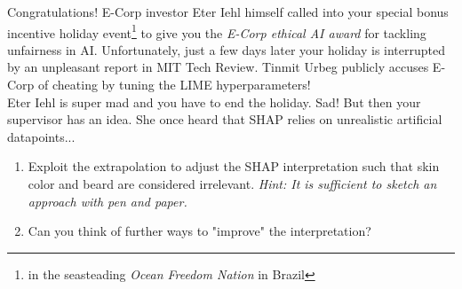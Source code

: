 \documentclass[a4paper]{article}
\begin{document}
{Congratulations! E-Corp investor Eter Iehl himself called into your special bonus incentive holiday event\footnote{in the seasteading \textit{Ocean Freedom Nation} in Brazil} to give you the \textit{E-Corp ethical AI award} for tackling unfairness in AI. Unfortunately, just a few days later your holiday is interrupted by an unpleasant report in MIT Tech Review. Tinmit Urbeg publicly accuses E-Corp of cheating by tuning the LIME hyperparameters!\\%
Eter Iehl is super mad and you have to end the holiday. Sad! But then your supervisor has an idea. She once heard that SHAP relies on unrealistic artificial datapoints...
\begin{enumerate}[resume]
    \item  Exploit the extrapolation to adjust the SHAP interpretation such that skin color and beard are considered irrelevant. \textit{Hint: It is sufficient to sketch an approach with pen and paper.}
    \item Can you think of further ways to "improve" the interpretation?
\end{enumerate}
}

\dlz

\end{document}
